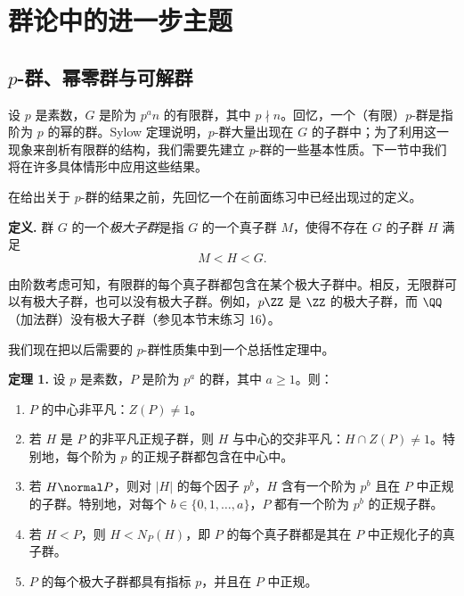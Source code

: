 \chapter{群论中的进一步主题}

\section{$p$-群、幂零群与可解群}

设 $p$ 是素数，$G$ 是阶为 $p^a n$ 的有限群，其中 $p\nmid n$。回忆，一个（有限）$p$-群是指阶为 $p$ 的幂的群。Sylow 定理说明，$p$-群大量出现在 $G$ 的子群中；为了利用这一现象来剖析有限群的结构，我们需要先建立 $p$-群的一些基本性质。下一节中我们将在许多具体情形中应用这些结果。

在给出关于 $p$-群的结果之前，先回忆一个在前面练习中已经出现过的定义。

\medskip
\noindent\textbf{定义.} 群 $G$ 的一个\emph{极大子群}是指 $G$ 的一个真子群 $M$，使得不存在 $G$ 的子群 $H$ 满足
\[
  M < H < G.
\]

由阶数考虑可知，有限群的每个真子群都包含在某个极大子群中。相反，无限群可以有极大子群，也可以没有极大子群。例如，$p\ZZ$ 是 $\ZZ$ 的极大子群，而 $\QQ$（加法群）没有极大子群（参见本节末练习 16）。

我们现在把以后需要的 $p$-群性质集中到一个总括性定理中。

\medskip
\noindent\textbf{定理 1.} 设 $p$ 是素数，$P$ 是阶为 $p^a$ 的群，其中 $a\geq 1$。则：
\begin{enumerate}[label=(\arabic*)]
  \item $P$ 的中心非平凡：$Z(P)\neq 1$。
  \item 若 $H$ 是 $P$ 的非平凡正规子群，则 $H$ 与中心的交非平凡：$H\cap Z(P)\neq 1$。特别地，每个阶为 $p$ 的正规子群都包含在中心中。
  \item 若 $H\normal P$，则对 $|H|$ 的每个因子 $p^b$，$H$ 含有一个阶为 $p^b$ 且在 $P$ 中正规的子群。特别地，对每个 $b\in\{0,1,\ldots,a\}$，$P$ 都有一个阶为 $p^b$ 的正规子群。
  \item 若 $H<P$，则 $H<N_P(H)$，即 $P$ 的每个真子群都是其在 $P$ 中正规化子的真子群。
  \item $P$ 的每个极大子群都具有指标 $p$，并且在 $P$ 中正规。
\end{enumerate}

